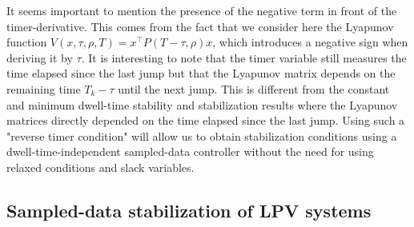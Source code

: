 \documentclass[12pt]{article}
\def\T{\textnormal{T}}
\providecommand{\bll}[1]{\color{black}{#1}\color{black}\hspace{0pt}}
\def\T{\intercal}
\begin{document}
It seems important to mention the presence of the negative term in front of the timer-derivative. This comes from the fact that we consider here the Lyapunov function  $V(x,\tau,\rho,T)=x^{\T}P(T-\tau,\rho)x$, which introduces a negative sign when deriving it by $\tau$. It is interesting to note that the timer variable still measures the time elapsed since the last jump but that the Lyapunov matrix depends on the remaining time $T_k-\tau$ until the next jump. This is different from the constant and minimum dwell-time stability and stabilization results where the Lyapunov matrices directly depended on the time elapsed since the last jump. Using such a "reverse timer condition" will allow us to obtain stabilization conditions using a dwell-time-independent sampled-data controller without the need for using relaxed conditions and slack variables. \bll{This will be further explained in the next section.}


\subsection{Sampled-data stabilization of LPV systems}
\end{document}
